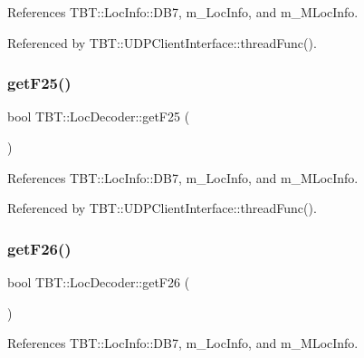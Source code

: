 References T\+B\+T\+::\+Loc\+Info\+::\+D\+B7, m\+\_\+\+Loc\+Info, and m\+\_\+\+M\+Loc\+Info.



Referenced by T\+B\+T\+::\+U\+D\+P\+Client\+Interface\+::thread\+Func().

\mbox{\label{classTBT_1_1LocDecoder_a3e06e61df29ee70660c003cbe81cb497_a3e06e61df29ee70660c003cbe81cb497}} 
\subsubsection{\texorpdfstring{get\+F25()}{getF25()}}
{\footnotesize\ttfamily bool T\+B\+T\+::\+Loc\+Decoder\+::get\+F25 (\begin{DoxyParamCaption}{ }\end{DoxyParamCaption})\hspace{0.3cm}{\ttfamily [inline]}}



References T\+B\+T\+::\+Loc\+Info\+::\+D\+B7, m\+\_\+\+Loc\+Info, and m\+\_\+\+M\+Loc\+Info.



Referenced by T\+B\+T\+::\+U\+D\+P\+Client\+Interface\+::thread\+Func().

\mbox{\label{classTBT_1_1LocDecoder_aa240dc8548525b91d931eed9cd549657_aa240dc8548525b91d931eed9cd549657}} 
\subsubsection{\texorpdfstring{get\+F26()}{getF26()}}
{\footnotesize\ttfamily bool T\+B\+T\+::\+Loc\+Decoder\+::get\+F26 (\begin{DoxyParamCaption}{ }\end{DoxyParamCaption})\hspace{0.3cm}{\ttfamily [inline]}}



References T\+B\+T\+::\+Loc\+Info\+::\+D\+B7, m\+\_\+\+Loc\+Info, and m\+\_\+\+M\+Loc\+Info.



